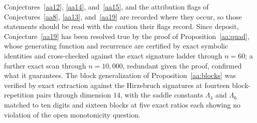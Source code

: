\documentclass[11pt]{article}
\theoremstyle{definition}
\begin{document}
Conjectures~\ref{aa12}, \ref{aa14}, and~\ref{aa15}, and the attribution flags of Conjectures~\ref{aa8}, \ref{aa13}, and~\ref{aa19} are recorded where they occur, so those statements should be read with the caution their flags record.  Since deposit, Conjecture~\ref{aa19} has been resolved true by the proof of Proposition~\ref{aa:quad}, whose generating function and recurrence are certified by exact symbolic identities and cross-checked against the exact signature ladder through $n=60$; a further exact scan through $n=10{,}000$, redundant given the proof, confirmed what it guarantees.  The block generalization of Proposition~\ref{aa:blocks} was verified by exact extraction against the Hirzebruch signatures at fourteen block-repetition pairs through dimension $14$, with the saddle constants $\Lambda_4$ and $\Lambda_6$ matched to ten digits and sixteen blocks at five exact ratios each showing no violation of the open monotonicity question.
\end{document}
